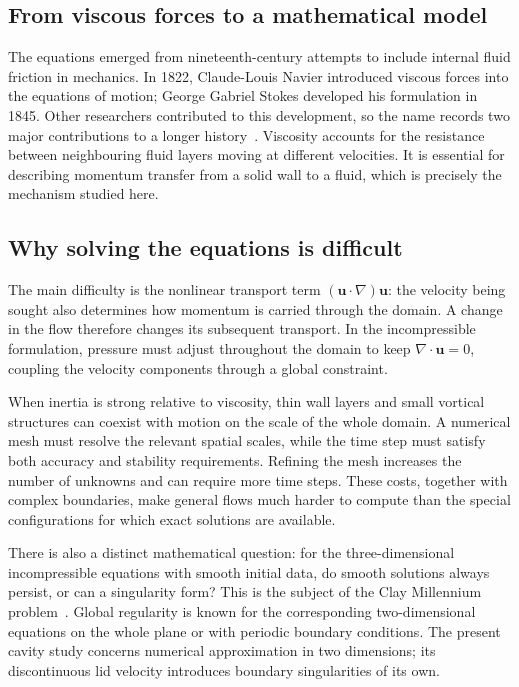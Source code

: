 \documentclass[11pt,a4paper]{article}
\begin{document}
\subsection{From viscous forces to a mathematical model}
The equations emerged from nineteenth-century attempts to include internal
fluid friction in mechanics. In 1822, Claude-Louis Navier introduced viscous
forces into the equations of motion; George Gabriel Stokes developed his
formulation in 1845. Other researchers contributed to this development, so the
name records two major contributions to a longer history~\cite{bistafa}.
Viscosity accounts for the resistance between neighbouring fluid layers moving
at different velocities. It is essential for describing momentum transfer
from a solid wall to a fluid, which is precisely the mechanism studied here.

\subsection{Why solving the equations is difficult}
The main difficulty is the nonlinear transport term
$(\mathbf{u}\cdot\nabla)\mathbf{u}$: the velocity being sought also determines
how momentum is carried through the domain. A change in the flow therefore
changes its subsequent transport. In the incompressible formulation, pressure
must adjust throughout the domain to keep $\nabla\cdot\mathbf{u}=0$, coupling
the velocity components through a global constraint.

When inertia is strong relative to viscosity, thin wall layers and small
vortical structures can coexist with motion on the scale of the whole domain.
A numerical mesh must resolve the relevant spatial scales, while the time
step must satisfy both accuracy and stability requirements. Refining the mesh
increases the number of unknowns and can require more time steps. These costs,
together with complex boundaries, make general flows much harder to compute
than the special configurations for which exact solutions are available.

There is also a distinct mathematical question: for the three-dimensional
incompressible equations with smooth initial data, do smooth solutions always
persist, or can a singularity form? This is the subject of the Clay Millennium
problem~\cite{fefferman}. Global regularity is known for the corresponding
two-dimensional equations on the whole plane or with periodic boundary
conditions. The present cavity study
concerns numerical approximation in two dimensions; its discontinuous lid
velocity introduces boundary singularities of its own.
\end{document}
